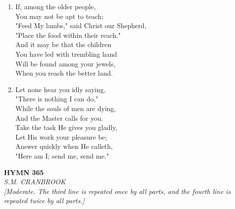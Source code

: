 \documentclass[11pt,a4paper]{article}
\begin{document}
\begin{enumerate}
    \item If, among the older people, \\
        You may not be apt to teach; \\
        "Feed My lambs," said Christ our Shepherd, \\
        "Place the food within their reach." \\
        And it may be that the children \\
        You have led with trembling hand \\
        Will be found among your jewels, \\
        When you reach the better land.

    \item Let none hear you idly saying, \\
        "There is nothing I can do," \\
        While the souls of men are dying, \\
        And the Master calls for you. \\
        Take the task He gives you gladly, \\
        Let His work your pleasure be; \\
        Answer quickly when He calleth, \\
        "Here am I; send me, send me."

\end{enumerate}

\newpage
\begin{center}
    {\Large \textbf{HYMN 365}}
    \\
    \textit{S.M. CRANBROOK}
    \\
    \textit{\small [Moderate. The third line is repeated once by all parts, and the fourth line is repeated twice by all parts.]}
\end{center}
\vspace{1em}
\end{document}
